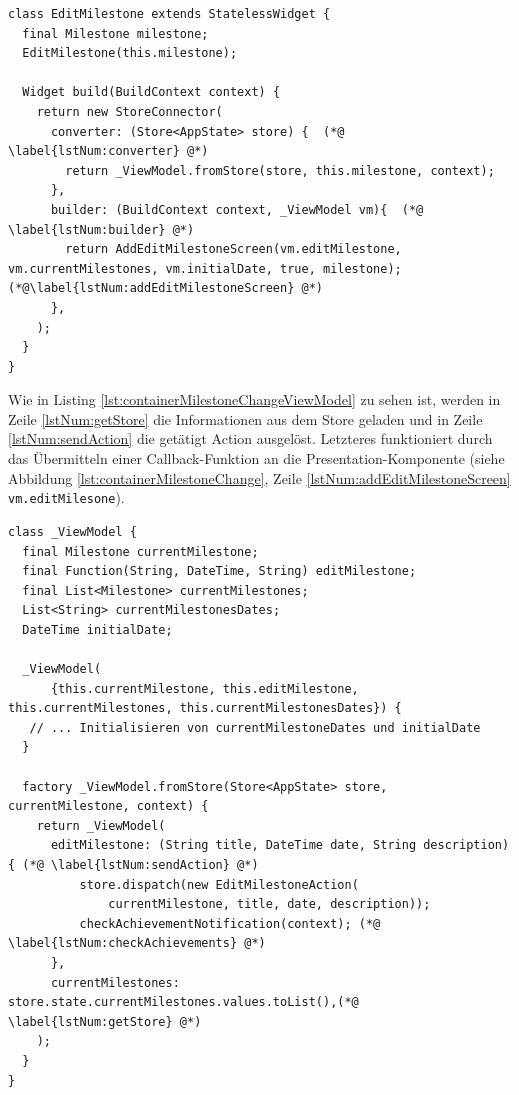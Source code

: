 \documentclass[bibliography=totoc,listof=totoc,BCOR=5mm,DIV=12,oneside]{scrbook}
\begin{document}
{\bigskip
\begin{lstlisting}[caption={Container-Komponente einer Meilensteinänderung},captionpos=b, label=lst:containerMilestoneChange]
class EditMilestone extends StatelessWidget {
  final Milestone milestone;
  EditMilestone(this.milestone);

  Widget build(BuildContext context) {
    return new StoreConnector(
      converter: (Store<AppState> store) {  (*@ \label{lstNum:converter} @*)
        return _ViewModel.fromStore(store, this.milestone, context);
      },
      builder: (BuildContext context, _ViewModel vm){  (*@ \label{lstNum:builder} @*)
        return AddEditMilestoneScreen(vm.editMilestone, vm.currentMilestones, vm.initialDate, true, milestone);(*@\label{lstNum:addEditMilestoneScreen} @*)
      },
    );
  }
}
\end{lstlisting}

\newpage
\par Wie in Listing \ref{lst:containerMilestoneChangeViewModel} zu sehen ist, werden in Zeile \ref{lstNum:getStore} die Informationen aus dem Store geladen und in Zeile \ref{lstNum:sendAction} die getätigt Action ausgelöst. Letzteres funktioniert durch das Übermitteln einer Callback-Funktion an die Presentation-Komponente (siehe Abbildung \ref{lst:containerMilestoneChange}, Zeile \ref{lstNum:addEditMilestoneScreen} \texttt{vm.editMilesone}).

\bigskip
\begin{lstlisting}[caption={ViewModel von Container-Komponente einer Meilensteinänderung},captionpos=b, label=lst:containerMilestoneChangeViewModel]
class _ViewModel {
  final Milestone currentMilestone;
  final Function(String, DateTime, String) editMilestone;
  final List<Milestone> currentMilestones;
  List<String> currentMilestonesDates;
  DateTime initialDate;

  _ViewModel(
      {this.currentMilestone, this.editMilestone, this.currentMilestones, this.currentMilestonesDates}) {
   // ... Initialisieren von currentMilestoneDates und initialDate
  }
  
  factory _ViewModel.fromStore(Store<AppState> store, currentMilestone, context) {
    return _ViewModel(
      editMilestone: (String title, DateTime date, String description) { (*@ \label{lstNum:sendAction} @*)
          store.dispatch(new EditMilestoneAction(
              currentMilestone, title, date, description));
          checkAchievementNotification(context); (*@ \label{lstNum:checkAchievements} @*)
      },
      currentMilestones: store.state.currentMilestones.values.toList(),(*@ \label{lstNum:getStore} @*)
    );
  }
}
\end{lstlisting}

}
\end{document}
